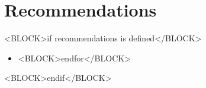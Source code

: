 \section{Recommendations}
<BLOCK>if recommendations is defined</BLOCK>
\begin{itemize}
<BLOCK> for recommendation in recommendations </BLOCK>
\item  
<BLOCK>endfor</BLOCK>
\end{itemize}
<BLOCK>endif</BLOCK>